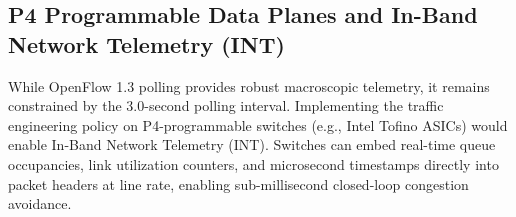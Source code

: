 \subsection{P4 Programmable Data Planes and In-Band Network Telemetry (INT)}
While OpenFlow 1.3 polling provides robust macroscopic telemetry, it remains constrained by the 3.0-second polling interval. Implementing the traffic engineering policy on P4-programmable switches (e.g., Intel Tofino ASICs) would enable In-Band Network Telemetry (INT). Switches can embed real-time queue occupancies, link utilization counters, and microsecond timestamps directly into packet headers at line rate, enabling sub-millisecond closed-loop congestion avoidance.
